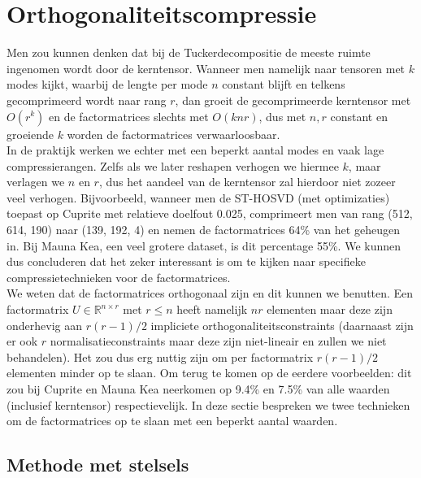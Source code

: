 \section{Orthogonaliteitscompressie}

Men zou kunnen denken dat bij de Tuckerdecompositie de meeste ruimte ingenomen wordt door de kerntensor. Wanneer men namelijk naar tensoren met $k$ modes kijkt, waarbij de lengte per mode $n$ constant blijft en telkens gecomprimeerd wordt naar rang $r$, dan groeit de gecomprimeerde kerntensor met $O(r^k)$ en de factormatrices slechts met $O(knr)$, dus met $n, r$ constant en groeiende $k$ worden de factormatrices verwaarloosbaar.\\

In de praktijk werken we echter met een beperkt aantal modes en vaak lage compressierangen. Zelfs als we later reshapen verhogen we hiermee $k$, maar verlagen we $n$ en $r$, dus het aandeel van de kerntensor zal hierdoor niet zozeer veel verhogen. Bijvoorbeeld, wanneer men de ST-HOSVD (met optimizaties) toepast op Cuprite met relatieve doelfout 0.025, comprimeert men van rang (512, 614, 190) naar (139, 192, 4) en nemen de factormatrices 64\% van het geheugen in. Bij Mauna Kea, een veel grotere dataset, is dit percentage 55\%. We kunnen dus concluderen dat het zeker interessant is om te kijken naar specifieke compressietechnieken voor de factormatrices.\\

We weten dat de factormatrices orthogonaal zijn en dit kunnen we benutten. Een factormatrix $U \in \mathbb{R}^{n \times r}$ met $r \leq n$ heeft namelijk $nr$ elementen maar deze zijn onderhevig aan $r(r - 1)/2$ impliciete orthogonaliteitsconstraints (daarnaast zijn er ook $r$ normalisatieconstraints maar deze zijn niet-lineair en zullen we niet behandelen). Het zou dus erg nuttig zijn om per factormatrix $r(r - 1)/2$ elementen minder op te slaan. Om terug te komen op de eerdere voorbeelden: dit zou bij Cuprite en Mauna Kea neerkomen op 9.4\% en 7.5\% van alle waarden (inclusief kerntensor) respectievelijk. In deze sectie bespreken we twee technieken om de factormatrices op te slaan met een beperkt aantal waarden.

\subsection{Methode met stelsels}
\label{subsec:methode-met-stelsels}

